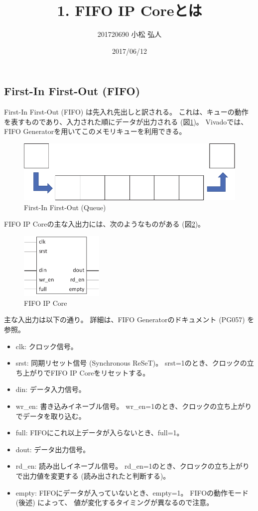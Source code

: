 \documentclass[11pt]{jsarticle}
\title{1. FIFO IP Coreとは}
\author{201720690 小松 弘人}
\date{2017/06/12}
\begin{document}
\maketitle
\subsection*{First-In First-Out (FIFO)}

First-In First-Out (FIFO) は先入れ先出しと訳される。
これは、キューの動作を表すものであり、入力された順にデータが出力される
(図\ref{img:queue})。
Vivadoでは、FIFO Generatorを用いてこのメモリキューを利用できる。

\begin{figure}[ht]
	\centering
	\includegraphics[width=0.6\linewidth]{../img/queue.pdf}
	\caption{First-In First-Out (Queue)}
	\label{img:queue}
\end{figure}

\vspace{-0.3cm}

FIFO IP Coreの主な入出力には、次のようなものがある (図\ref{img:fifo_ip})。
\begin{figure}[ht]
	\centering
	\includegraphics[width=4cm]{../img/fifo_ip.pdf}
	\caption{FIFO IP Core}
	\label{img:fifo_ip}
\end{figure}

\vspace{-0.3cm}

主な入出力は以下の通り。
詳細は、FIFO Generatorのドキュメント (PG057) を参照。
\begin{itemize}
	\item
		clk:
		クロック信号。
	\item
		srst:
		同期リセット信号 (Synchronous ReSeT)。
		srst=1のとき、クロックの立ち上がりでFIFO IP Coreをリセットする。
	\item
		din:
		データ入力信号。
	\item
		wr\_en:
		書き込みイネーブル信号。
		wr\_en=1のとき、クロックの立ち上がりでデータを取り込む。
	\item
		full:
		FIFOにこれ以上データが入らないとき、full=1。
	\item
		dout:
		データ出力信号。
	\item
		rd\_en:
		読み出しイネーブル信号。
		rd\_en=1のとき、クロックの立ち上がりで出力値を変更する
		(読み出されたと判断する)。
	\item
		empty:
		FIFOにデータが入っていないとき、empty=1。
		FIFOの動作モード (後述) によって、
		値が変化するタイミングが異なるので注意。
\end{itemize}
\end{document}
